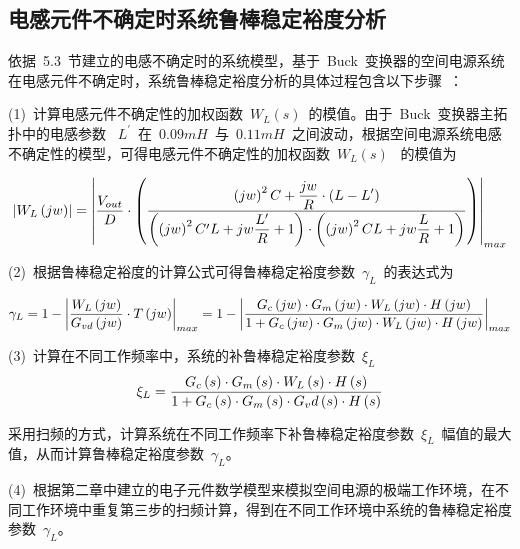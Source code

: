 \subsection{电感元件不确定时系统鲁棒稳定裕度分析}
依据~5.3~节建立的电感不确定时的系统模型，基于~Buck~变换器的空间电源系统在电感元件不确定时，系统鲁棒稳定裕度分析的具体过程包含以下步骤~：

(1)~计算电感元件不确定性的加权函数~$W_L\left(s\right)$~的模值。由于~Buck~变换器主拓扑中的电感参数
~$L^{\prime}$~在~$0.09mH$~与~$0.11mH$~之间波动，根据空间电源系统电感不确定性的模型，可得电感元件不确定性的加权函数~$W_L\left(s\right)$~ 的模值为

\begin{small}
\begin{equation}\label{equ:chap5:Index23}
\left|W_L\left(jw\right) \right|=\left|  \displaystyle\frac{V_{out}}{D}\cdot\left(\displaystyle\frac{\left(jw\right)^2C+\displaystyle\frac{jw}{R}\cdot\left(L-L^{\prime}\right)}{\left(\left(jw\right)^2C^{\prime}L+jw\displaystyle\frac{L^{\prime}}{R}+1\right)\cdot\left(\left(jw\right)^2CL+jw\displaystyle\frac{L}{R}+1\right)}\right)
 \right|_{max }
\end{equation}
 \end{small}

(2)~根据鲁棒稳定裕度的计算公式可得鲁棒稳定裕度参数~$\gamma_L$~的表达式为
\begin{small}
\begin{equation}\label{equ:chap5:Index24}
\gamma_L=1-\left|\displaystyle\frac{W_L\left(jw\right)}{G_{vd}\left(jw\right)}\cdot T\left(jw\right)\right|_{max}=1-\left|\displaystyle\frac{G_c\left(jw\right)\cdot G_m\left(jw\right)\cdot W_L\left(jw\right)\cdot H\left(jw\right)}{1+G_c\left(jw\right)\cdot G_m\left(jw\right)\cdot W_L\left(jw\right)\cdot H\left(jw\right)}\right|_{max}
\end{equation}
\end{small}

(3)~计算在不同工作频率中，系统的补鲁棒稳定裕度参数~$\xi_L$
\begin{equation}\label{equ:chap5:Index25}
\xi_L=\displaystyle\frac{G_c\left(s\right)\cdot G_m\left(s\right)\cdot W_L\left(s\right)\cdot H\left(s\right)}{1+G_c\left(s\right)\cdot G_m\left(s\right)\cdot G_vd\left(s\right)\cdot H\left(s\right)}
\end{equation}

采用扫频的方式，计算系统在不同工作频率下补鲁棒稳定裕度参数~$\xi_L$~幅值的最大值，从而计算鲁棒稳定裕度参数~$\gamma_L$。

(4)~根据第二章中建立的电子元件数学模型来模拟空间电源的极端工作环境，在不同工作环境中重复第三步的扫频计算，得到在不同工作环境中系统的鲁棒稳定裕度参数~$\gamma_L$。
